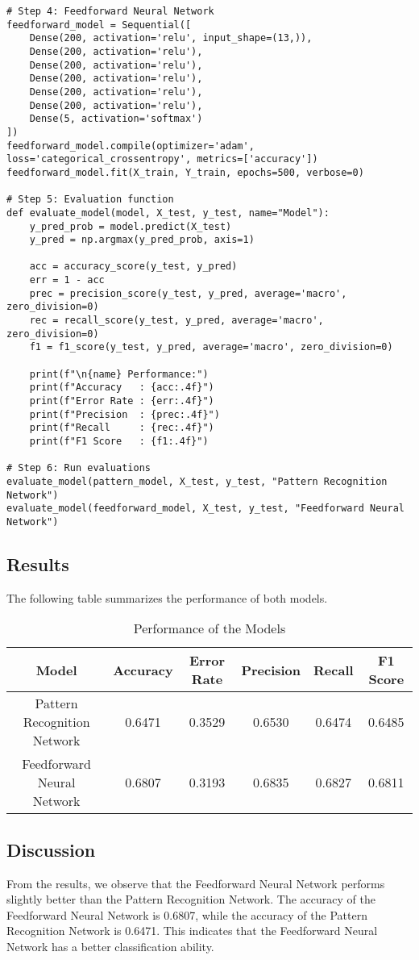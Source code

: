 \documentclass[a4paper,12pt]{article}
\begin{document}
\begin{verbatim}
# Step 4: Feedforward Neural Network
feedforward_model = Sequential([
    Dense(200, activation='relu', input_shape=(13,)),
    Dense(200, activation='relu'),
    Dense(200, activation='relu'),
    Dense(200, activation='relu'),
    Dense(200, activation='relu'),
    Dense(200, activation='relu'),
    Dense(5, activation='softmax')
])
feedforward_model.compile(optimizer='adam', loss='categorical_crossentropy', metrics=['accuracy'])
feedforward_model.fit(X_train, Y_train, epochs=500, verbose=0)

# Step 5: Evaluation function
def evaluate_model(model, X_test, y_test, name="Model"):
    y_pred_prob = model.predict(X_test)
    y_pred = np.argmax(y_pred_prob, axis=1)

    acc = accuracy_score(y_test, y_pred)
    err = 1 - acc
    prec = precision_score(y_test, y_pred, average='macro', zero_division=0)
    rec = recall_score(y_test, y_pred, average='macro', zero_division=0)
    f1 = f1_score(y_test, y_pred, average='macro', zero_division=0)

    print(f"\n{name} Performance:")
    print(f"Accuracy   : {acc:.4f}")
    print(f"Error Rate : {err:.4f}")
    print(f"Precision  : {prec:.4f}")
    print(f"Recall     : {rec:.4f}")
    print(f"F1 Score   : {f1:.4f}")

# Step 6: Run evaluations
evaluate_model(pattern_model, X_test, y_test, "Pattern Recognition Network")
evaluate_model(feedforward_model, X_test, y_test, "Feedforward Neural Network")
\end{verbatim}

\subsection{Results}
The following table summarizes the performance of both models.

\begin{table}[h!]
\centering
\begin{tabular}{|c|c|c|c|c|c|}
\hline
Model & Accuracy & Error Rate & Precision & Recall & F1 Score \\
\hline
Pattern Recognition Network & 0.6471 & 0.3529 & 0.6530 & 0.6474 & 0.6485 \\
Feedforward Neural Network & 0.6807 & 0.3193 & 0.6835 & 0.6827 & 0.6811 \\
\hline
\end{tabular}
\caption{Performance of the Models}
\end{table}

\subsection{Discussion}
From the results, we observe that the Feedforward Neural Network performs slightly better than the Pattern Recognition Network. The accuracy of the Feedforward Neural Network is 0.6807, while the accuracy of the Pattern Recognition Network is 0.6471. This indicates that the Feedforward Neural Network has a better classification ability.
\end{document}
